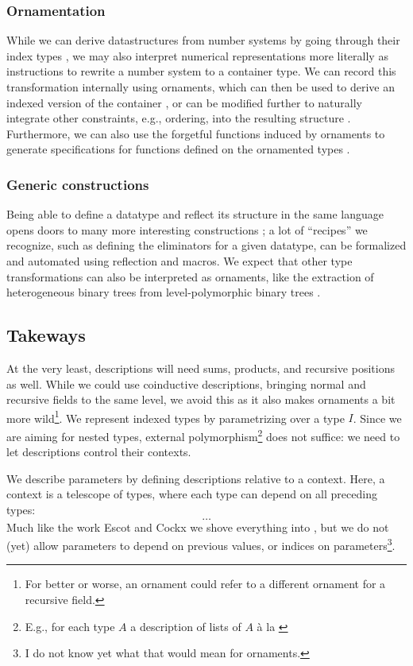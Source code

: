 \documentclass[10pt]{article}
\theoremstyle{plain}
\theoremstyle{definition}
\begin{document}
\subsubsection{Ornamentation}
While we can derive datastructures from number systems by going through their index types \cite{calcdata}, we may also interpret numerical representations more literally as instructions to rewrite a number system to a container type. We can record this transformation internally using ornaments, which can then be used to derive an indexed version of the container \cite{algorn}, or can be modified further to naturally integrate other constraints, e.g., ordering, into the resulting structure \cite{progorn}. Furthermore, we can also use the forgetful functions induced by ornaments to generate specifications for functions defined on the ornamented types \cite{orntrans}.

\subsubsection{Generic constructions}
Being able to define a datatype and reflect its structure in the same language opens doors to many more interesting constructions \cite{practgen}; a lot of ``recipes'' we recognize, such as defining the eliminators for a given datatype, can be formalized and automated using reflection and macros. We expect that other type transformations can also be interpreted as ornaments, like the extraction of heterogeneous binary trees from level-polymorphic binary trees \cite{hetbin}. 


\subsection{Takeways}
At the very least, descriptions will need sums, products, and recursive positions as well. While we could use coinductive descriptions, bringing normal and recursive fields to the same level, we avoid this as it also makes ornaments a bit more wild\footnote{For better or worse, an ornament could refer to a different ornament for a recursive field.}. We represent indexed types by parametrizing over a type $I$. Since we are aiming for nested types, external polymorphism\footnote{E.g., for each type $A$ a description of lists of $A$ à la \cite{progorn}} does not suffice: we need to let descriptions control their contexts.

We describe parameters by defining descriptions relative to a context. Here, a context is a telescope of types, where each type can depend on all preceding types:
\[ \dots \]
Much like the work Escot and Cockx \cite{practgen} we shove everything into , but we do not (yet) allow parameters to depend on previous values, or indices on parameters\footnote{I do not know yet what that would mean for ornaments.}.
\end{document}
